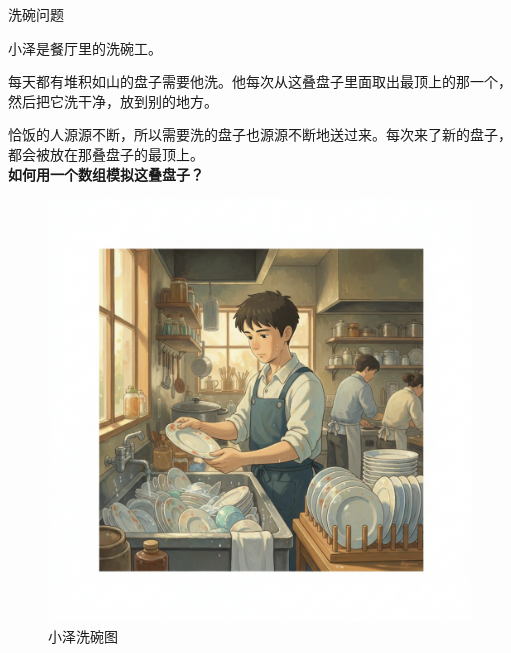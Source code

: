 \documentclass{beamer}
\begin{document}
\begin{frame}{洗碗问题}
    \begin{minipage}[c]{0.5\linewidth}
        小泽是餐厅里的洗碗工。

        每天都有堆积如山的盘子需要他洗。他每次从这叠盘子里面取出最顶上的那一个，然后把它洗干净，放到别的地方。

        恰饭的人源源不断，所以需要洗的盘子也源源不断地送过来。每次来了新的盘子，都会被放在那叠盘子的最顶上。\\

        \textbf{如何用一个数组模拟这叠盘子？}
    \end{minipage}
    \begin{minipage}{0.4\linewidth}
        \begin{figure}
            \begin{center}
                \includegraphics[width=\linewidth]{./pic/Gemini_Generated_Image_4uekal4uekal4uek.png}
                \caption{小泽洗碗图}
            \end{center}
        \end{figure}
    \end{minipage}
\end{frame}
\end{document}
